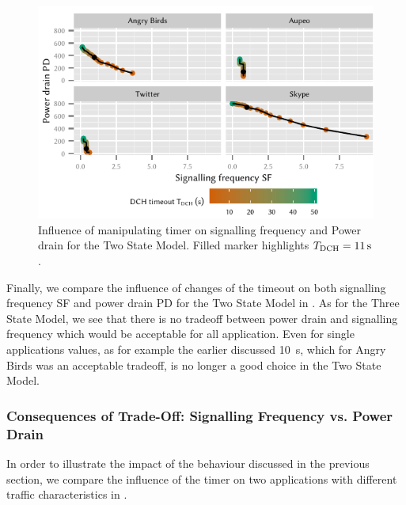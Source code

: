\begin{figure}
	\centering
	\includegraphics{network/network_traces/numerical_results/figures/2_state_signalling_vs_power_consumption}
	\caption{Influence of manipulating \TDCH timer on signalling frequency  and Power drain  for the Two State Model. Filled marker highlights \(T_{\text{DCH}} = \SI{11}{\second}\).}\label{fig:network:network_traces:numerical_results:two_states:trade_off}
\end{figure}
Finally, we compare the influence of changes of the \TDCH timeout on both signalling frequency \gls{SF} and power drain \gls{PD} for the Two State Model in .
As for the Three State Model, we see that there is no tradeoff between power drain and signalling frequency which would be acceptable for all application.
Even for single applications \TDCH values, as for example the earlier discussed \SI{10}{\second}, which for Angry Birds was an acceptable tradeoff, is no longer a good choice in the Two State Model.

\subsubsection*{Consequences of Trade-Off: Signalling Frequency vs. Power Drain}\label{sec:network:network_traces:numerical_results:trade_off}

In order to illustrate the impact of the behaviour discussed in the previous section, we compare the influence of the \TDCH timer on two applications with different traffic characteristics in  .

